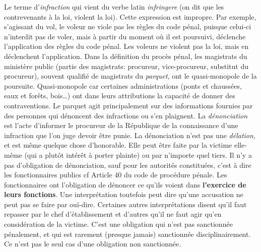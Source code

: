 \documentclass[math]{cours}
\begin{document}
Le terme d'\emph{infraction} qui vient du verbe latin \emph{infringere} (on dit que les contrevenants à la loi, violent la loi).
Cette expression est impropre.
Par exemple, s'agissant du vol, le voleur ne viole pas les règles du code pénal, puisque celui-ci n'interdit pas de voler, mais à partir du moment où il est poursuivi, déclenche l'application des règles du code pénal.
Les voleurs ne violent pas la loi, mais en déclenchent l'application.
Dans la définition du procès pénal, les magistrats du ministère public (partie des magistrats: procureur, vice-procureur, substitut du procureur), souvent qualifié de magistrats du \emph{parquet}, ont le quasi-monopole de la poursuite.
Quasi-monopole car certaines administrations (ponts et chaussées, eaux et forêts, bois\ldots) ont dans leurs attributions la capacité de donner des contraventions.
Le parquet agit principalement sur des informations fournies par des personnes qui dénoncent des infractions ou s'en plaignent.
La \emph{dénonciation} est l'acte d'informer le procureur de la République de la connaissance d'une infraction que l'on juge devoir être punie.
La dénonciation n'est pas une \emph{délation}, et est même quelque chose d'honorable.
Elle peut être faite par la victime elle-même (qui a plutôt intérêt à porter plainte) ou par n'importe quel tiers.
Il n'y a pas d'obligation de dénonciation, sauf pour les autorités constituées, c'est à dire les fonctionnaires publics cf Article 40 du code de procédure pénale.
Les fonctionnaires ont l'obligation de dénoncer ce qu'ils voient dans \textbf{l'exercice de leurs fonctions}.
Une interprétation toutefois peut dire qu'une accusation ne peut pas se faire par ouï-dire.
Certaines autres interprétations disent qu'il faut repasser par le chef d'établissement et d'autres qu'il ne faut agir qu'en considération de la victime.
C'est une obligation qui n'est pas sanctionnée pénalement, et qui est rarement (presque jamais) sanctionnée disciplinairement.
Ce n'est pas le seul cas d'une obligation non sanctionnée.\\
\end{document}
